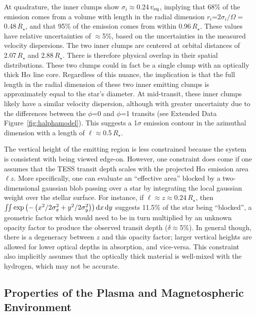 \documentclass{nature3}
\begin{document}
\begin{methods}
At quadrature, the inner clumps show $\sigma_i$$\approx$0.24\,$v_{\rm
eq}$, implying that 68\% of the emission comes from a volume with length
in the radial dimension $r_i$=$2\sigma_i / \Omega$$=$0.48\,$R_\star$,
and that 95\% of the emission comes from within 0.96\,$R_\star$.  These
values have relative uncertainties of $\approx$5\%, based on the
uncertainties in the measured velocity dispersions.  The two inner
clumps are centered at orbital distances of 2.07\,$R_\star$ and 2.88\,$R_\star$.
There is therefore physical overlap in their spatial distributions.
These two clumps could in fact be a single clump with an optically thick
H$\alpha$ line core.  Regardless of this nuance, the implication is that
the full length in the radial dimension of these two inner emitting
clumps is approximately equal to the star's diameter.  At mid-transit, these
inner clumps likely have a similar velocity dispersion, although with
greater uncertainty due to the differences between the $\phi$=0 and
$\phi$=1 transits (see Extended Data Figure~\ref{fig:halphamodel}).
This suggests a 1$\sigma$ emission contour in the azimuthal dimension
with a length of $\ell$$\approx$0.5\,$R_\star$.

The vertical height of the emitting region is less constrained because
the system is consistent with being viewed edge-on.  However, one
constraint does come if one assumes that the TESS transit depth scales
with the projected H$\alpha$ emission area $\ell z$.  
More specifically,
one can evaluate an ``effective area'' blocked by a two-dimensional
gaussian blob passing over a star by integrating the local gaussian
weight over the stellar surface.  For instance, if
$\ell$$\approx$$z$$\approx$0.24\,$R_\star$, then
$\iint \exp \left(
  -\left( x^2/2\sigma_x^2 + y^2/2\sigma_y^2 \right)
\right) {\rm d}x \, {\rm d}y$
suggests 11.5\% of the star being ``blocked'', a geometric factor which
would need to be in turn multiplied by an unknown opacity factor to
produce the observed transit depth ($\delta$$\approx$5\%).  In general
though, there is a degeneracy between $z$ and this opacity factor; larger
vertical heights are allowed for lower optical depths in absorption, and
vice-versa.  
This constraint also implicitly assumes that the optically thick
material is well-mixed with the hydrogen, which may not be accurate.


\subsection{Properties of the Plasma and Magnetospheric Environment}\phantom{+}
\label{subsec:gas}


\end{methods}
\end{document}
